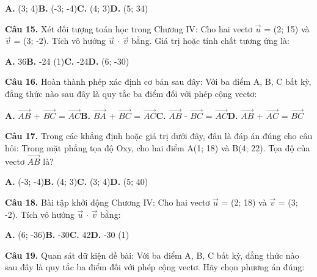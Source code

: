 \documentclass[11pt,a4paper]{article}
\begin{document}
\hspace*{1.5em}\textbf{A.} (3; 4)\quad\quad \textbf{B.} (-3; -4)\quad\quad \textbf{C.} (4; 3)\quad\quad \textbf{D.} (5; 34)\par\vspace{2pt}
\textbf{\color{primary} Câu 15.} Xét đối tượng toán học trong Chương IV: Cho hai vectơ $\vec{u}$ = (2; 15) và $\vec{v}$ = (3; -2). Tích vô hướng $\vec{u}$ $\cdot$ $\vec{v}$ bằng. Giá trị hoặc tính chất tương ứng là:\par
\hspace*{1.5em}\textbf{A.} 36\quad\quad \textbf{B.} -24 (1)\quad\quad \textbf{C.} -24\quad\quad \textbf{D.} (6; -30)\par\vspace{2pt}
\textbf{\color{primary} Câu 16.} Hoàn thành phép xác định cơ bản sau đây: Với ba điểm A, B, C bất kỳ, đẳng thức nào sau đây là quy tắc ba điểm đối với phép cộng vectơ:\par
\hspace*{1.5em}\textbf{A.} $\overrightarrow{AB}$ + $\overrightarrow{BC}$ = $\overrightarrow{AC}$\quad\quad \textbf{B.} $\overrightarrow{BA}$ + $\overrightarrow{BC}$ = $\overrightarrow{AC}$\quad\quad \textbf{C.} $\overrightarrow{AB}$ - $\overrightarrow{BC}$ = $\overrightarrow{AC}$\quad\quad \textbf{D.} $\overrightarrow{AB}$ + $\overrightarrow{AC}$ = $\overrightarrow{BC}$\par\vspace{2pt}
\textbf{\color{primary} Câu 17.} Trong các khẳng định hoặc giá trị dưới đây, đâu là đáp án đúng cho câu hỏi: Trong mặt phẳng tọa độ Oxy, cho hai điểm A(1; 18) và B(4; 22). Tọa độ của vectơ $\overrightarrow{AB}$ là?\par
\hspace*{1.5em}\textbf{A.} (-3; -4)\quad\quad \textbf{B.} (4; 3)\quad\quad \textbf{C.} (3; 4)\quad\quad \textbf{D.} (5; 40)\par\vspace{2pt}
\textbf{\color{primary} Câu 18.} Bài tập khởi động Chương IV: Cho hai vectơ $\vec{u}$ = (2; 18) và $\vec{v}$ = (3; -2). Tích vô hướng $\vec{u}$ $\cdot$ $\vec{v}$ bằng:\par
\hspace*{1.5em}\textbf{A.} (6; -36)\quad\quad \textbf{B.} -30\quad\quad \textbf{C.} 42\quad\quad \textbf{D.} -30 (1)\par\vspace{2pt}
\textbf{\color{primary} Câu 19.} Quan sát dữ kiện đề bài: Với ba điểm A, B, C bất kỳ, đẳng thức nào sau đây là quy tắc ba điểm đối với phép cộng vectơ. Hãy chọn phương án đúng:\par
\end{document}
